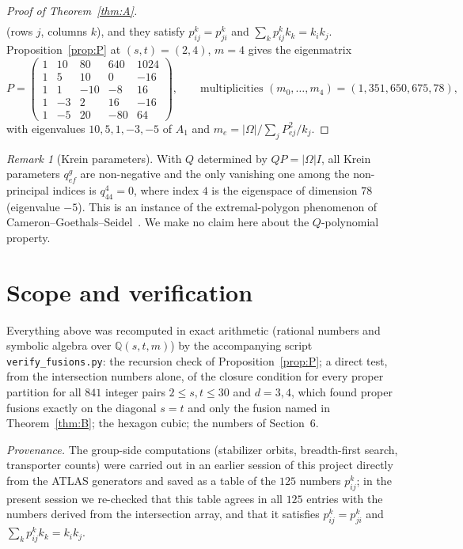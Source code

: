 \documentclass[11pt]{article}
\theoremstyle{remark}
\newtheorem{remark}[theorem]{Remark}
\begin{document}
\begin{proof}[Proof of Theorem~\ref{thm:A}]
\begin{equation}
\begin{gathered}
\end{gathered}
\end{equation}
(rows $j$, columns $k$), and they satisfy $p_{ij}^k=p_{ji}^k$ and $\sum_kp_{ij}^kk_k=k_ik_j$. Proposition~\ref{prop:P} at $(s,t)=(2,4)$, $m=4$ gives the eigenmatrix
\begin{equation}\label{eq:P}
P=\begin{pmatrix}1 & 10 & 80 & 640 & 1024 \\ 1 & 5 & 10 & 0 & -16 \\ 1 & 1 & -10 & -8 & 16 \\ 1 & -3 & 2 & 16 & -16 \\ 1 & -5 & 20 & -80 & 64\end{pmatrix},\qquad \text{multiplicities }(m_0,\dots,m_4)=(1,351,650,675,78),
\end{equation}
with eigenvalues $10,5,1,-3,-5$ of $A_1$ and $m_e=|\Omega|\big/\sum_jP_{ej}^2/k_j$.
\end{proof}

\begin{remark}[Krein parameters]
With $Q$ determined by $QP=|\Omega|I$, all Krein parameters $q_{ef}^g$ are non-negative and the only vanishing one among the non-principal indices is $q_{44}^{4}=0$, where index $4$ is the eigenspace of dimension $78$ (eigenvalue $-5$). This is an instance of the extremal-polygon phenomenon of Cameron--Goethals--Seidel~\cite{CGS}. We make no claim here about the $Q$-polynomial property.
\end{remark}

\section{Scope and verification}

Everything above was recomputed in exact arithmetic (rational numbers and symbolic algebra over $\mathbb Q(s,t,m)$) by the accompanying script \texttt{verify\_fusions.py}: the recursion check of Proposition~\ref{prop:P}; a direct test, from the intersection numbers alone, of the closure condition for every proper partition for all $841$ integer pairs $2\le s,t\le30$ and $d=3,4$, which found proper fusions exactly on the diagonal $s=t$ and only the fusion named in Theorem~\ref{thm:B}; the hexagon cubic; the numbers of Section~6.

\emph{Provenance.} The group-side computations (stabilizer orbits, breadth-first search, transporter counts) were carried out in an earlier session of this project directly from the ATLAS generators and saved as a table of the $125$ numbers $p_{ij}^k$; in the present session we re-checked that this table agrees in all $125$ entries with the numbers derived from the intersection array, and that it satisfies $p_{ij}^k=p_{ji}^k$ and $\sum_kp_{ij}^kk_k=k_ik_j$.
\end{document}
